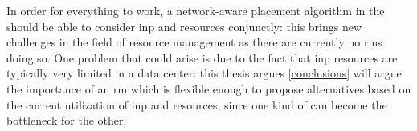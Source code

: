 In order for everything to work, a network-aware placement algorithm in the  should be able to consider \gls{inp} and  resources conjunctly: this brings new challenges in the field of resource management as there are currently no \glspl{rm} doing so.
One problem that could arise is due to the fact that \gls{inp} resources are typically very limited in a data center:
\ifdefined\THESISSUMMARY
this thesis argues
\else
\autoref{conclusions} will argue
\fi
the importance of an \gls{rm} which is flexible enough to propose alternatives based on the current utilization of \gls{inp} and  resources, since one kind of  can become the bottleneck for the other.
